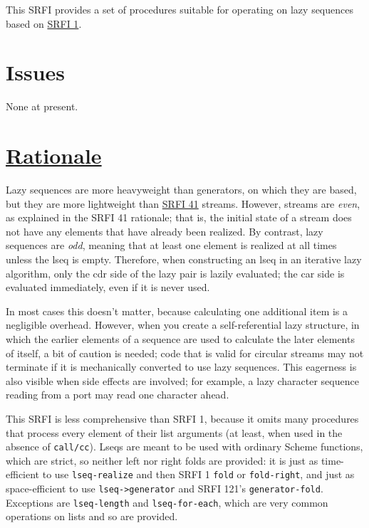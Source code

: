 This SRFI provides a set of procedures suitable for operating on lazy
sequences based on
\href{http://srfi.schemers.org/srfi-1/srfi-1.html}{SRFI 1}.

\section{Issues}\label{issues}

None at present.

\section{\texorpdfstring{\href{}{Rationale}}{Rationale}}\label{rationale}

Lazy sequences are more heavyweight than generators, on which they are
based, but they are more lightweight than
\href{http://srfi.schemers.org/srfi-41/srfi-41.html}{SRFI 41} streams.
However, streams are \emph{even}, as explained in the SRFI 41 rationale;
that is, the initial state of a stream does not have any elements that
have already been realized. By contrast, lazy sequences are \emph{odd},
meaning that at least one element is realized at all times unless the
lseq is empty. Therefore, when constructing an lseq in an iterative lazy
algorithm, only the cdr side of the lazy pair is lazily evaluated; the
car side is evaluated immediately, even if it is never used.

In most cases this doesn't matter, because calculating one additional
item is a negligible overhead. However, when you create a
self-referential lazy structure, in which the earlier elements of a
sequence are used to calculate the later elements of itself, a bit of
caution is needed; code that is valid for circular streams may not
terminate if it is mechanically converted to use lazy sequences. This
eagerness is also visible when side effects are involved; for example, a
lazy character sequence reading from a port may read one character
ahead.

This SRFI is less comprehensive than SRFI 1, because it omits many
procedures that process every element of their list arguments (at least,
when used in the absence of \texttt{call/cc}). Lseqs are meant to be
used with ordinary Scheme functions, which are strict, so neither left
nor right folds are provided: it is just as time-efficient to use
\texttt{lseq-realize} and then SRFI 1 \texttt{fold} or
\texttt{fold-right}, and just as space-efficient to use
\texttt{lseq-\textgreater{}generator} and SRFI 121's
\texttt{generator-fold}. Exceptions are \texttt{lseq-length} and
\texttt{lseq-for-each}, which are very common operations on lists and so
are provided.

